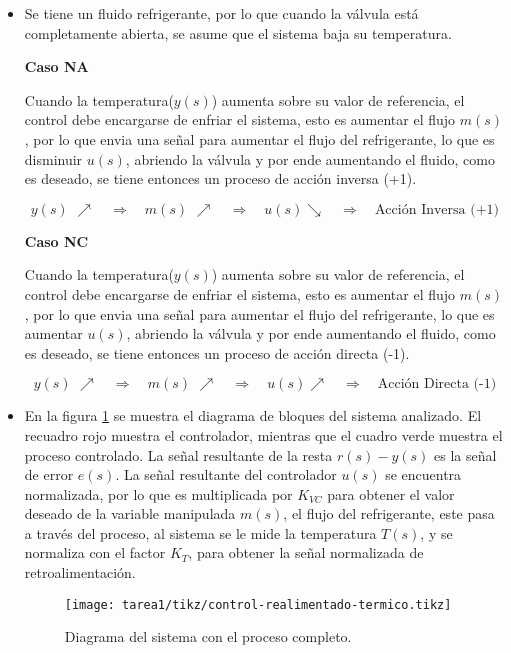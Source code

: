 \begin{ejercicio}
  \begin{itemize}
    \item 
    Se tiene un fluido refrigerante, por lo que cuando la válvula está completamente abierta, se asume que el sistema baja su temperatura.\\\par

    \textbf{Caso NA}\par
    Cuando la temperatura($y(s)$) aumenta sobre su valor de referencia, el control debe encargarse de enfriar el sistema, esto es aumentar el flujo $m(s)$, por lo que envia una señal para aumentar el flujo del refrigerante, lo que es disminuir $u(s)$, abriendo la válvula y por ende aumentando el fluido, como es deseado, se tiene entonces un proceso de acción inversa (+1).

    \begin{equation*}
      y(s) \mspace{6mu} \nearrow  \quad \Rightarrow \quad  m(s) \mspace{6mu} \nearrow  \quad \Rightarrow \quad  u(s) \searrow \quad \Rightarrow \quad \text{Acción Inversa (+1)}
    \end{equation*}

    \textbf{Caso NC}\par
    Cuando la temperatura($y(s)$) aumenta sobre su valor de referencia, el control debe encargarse de enfriar el sistema, esto es aumentar el flujo $m(s)$, por lo que envia una señal para aumentar el flujo del refrigerante, lo que es aumentar $u(s)$, abriendo la válvula y por ende aumentando el fluido, como es deseado, se tiene entonces un proceso de acción directa (-1).

    \begin{equation*}
      y(s) \mspace{6mu} \nearrow  \quad \Rightarrow \quad  m(s) \mspace{6mu} \nearrow  \quad \Rightarrow \quad  u(s) \nearrow \quad \Rightarrow \quad \text{Acción Directa (-1)}
    \end{equation*}

  \item
  En la figura \ref{ej3:diag1} se muestra el diagrama de bloques del sistema analizado. El recuadro rojo muestra el controlador, mientras que el cuadro verde muestra el proceso controlado. La señal resultante de la resta $r(s) - y(s)$ es la señal de error $e(s)$. La señal resultante del controlador $u(s)$ se encuentra normalizada, por lo que es multiplicada por $K_{VC}$ para obtener el valor deseado de la variable manipulada $m(s)$, el flujo del refrigerante, este pasa a través del proceso, al sistema se le mide la temperatura $T(s)$, y se normaliza con el factor $K_T$, para obtener la señal normalizada de retroalimentación.
  \begin{figure}[H]
      \centering
      \texttt{[image: tarea1/tikz/control-realimentado-termico.tikz]}
      \caption{Diagrama del sistema con el proceso completo.}
      \label{ej3:diag1}
    \end{figure}
  \end{itemize}
\end{ejercicio}